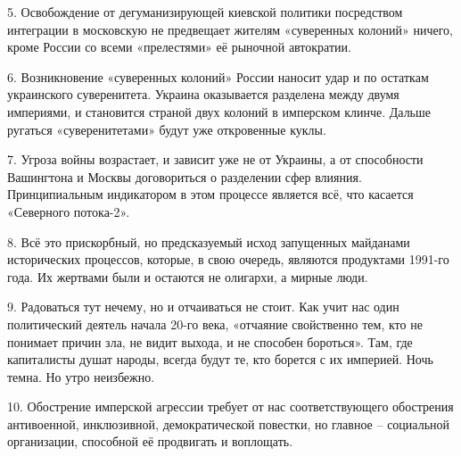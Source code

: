 5. Освобождение от дегуманизирующей киевской политики посредством интеграции в
московскую не предвещает жителям «суверенных колоний» ничего, кроме России со
всеми «прелестями» её рыночной автократии.  

6. Возникновение «суверенных колоний» России наносит удар и по остаткам
украинского суверенитета. Украина оказывается разделена между двумя империями,
и становится страной двух колоний в имперском клинче. Дальше ругаться
«суверенитетами» будут уже откровенные куклы.

7. Угроза войны возрастает, и зависит уже не от Украины, а от способности
Вашингтона и Москвы договориться о разделении сфер влияния. Принципиальным
индикатором в этом процессе является всё, что касается «Северного потока-2».

8. Всё это прискорбный, но предсказуемый исход запущенных майданами
исторических процессов, которые, в свою очередь, являются продуктами 1991-го
года. Их жертвами были и остаются не олигархи, а мирные люди.

9. Радоваться тут нечему, но и отчаиваться не стоит. Как учит нас один
политический деятель начала 20-го века, «отчаяние свойственно тем, кто не
понимает причин зла, не видит выхода, и не способен бороться». Там, где
капиталисты душат народы, всегда будут те, кто борется с их империей. Ночь
темна. Но утро неизбежно.

10. Обострение имперской агрессии требует от нас соответствующего обострения
антивоенной, инклюзивной, демократической повестки, но главное – социальной
организации, способной её продвигать и воплощать.
